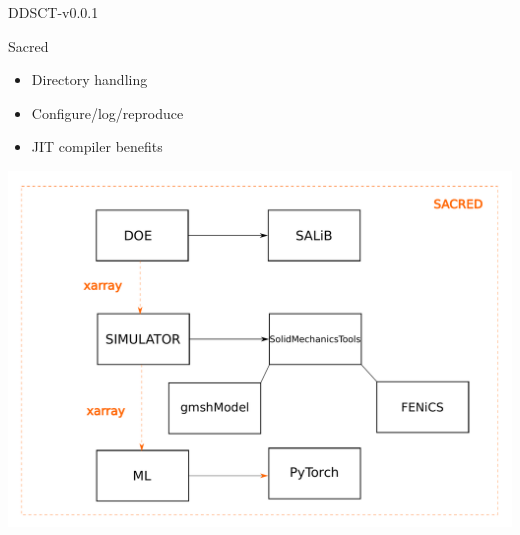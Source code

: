 \documentclass[aspectratio=169]{beamer}
\begin{document}
\begin{frame}{DDSCT-v0.0.1}
  \begin{minipage}{0.5\textwidth}
    \begin{block}{\color{White} Sacred}
  \begin{itemize}
    \item Directory handling
    \item Configure/log/reproduce
    \item JIT compiler benefits
  \end{itemize}
    \end{block}
  \end{minipage}%
  \begin{minipage}{0.5\textwidth}
    \includegraphics[width=\textwidth]{Figures/DDSCT-flow.pdf}
  \end{minipage}
\end{frame}
\end{document}

